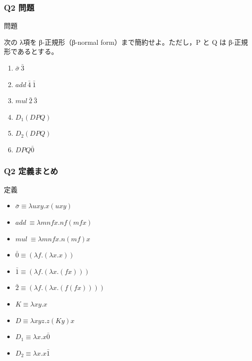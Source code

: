 \begin{frame}
\frametitle{Q2 問題}
\begin{alertblock}{問題}

    次の λ項を β-正規形（β-normal form）まで簡約せよ。ただし，P と Q は β-正規形であるとする。

    \begin{enumerate}[(1)]
        \item $\bar{\sigma}\ \bar{3}$
        \item $add\ \bar{4}\ \bar{1}$
        \item $mul\ \bar{2}\ \bar{3}$
        \item $D_1(DPQ)$
        \item $D_2(DPQ)$
        \item $DPQ\bar{0}$
    \end{enumerate}
\end{alertblock}
\end{frame}

\begin{frame}
\frametitle{Q2 定義まとめ}
\begin{alertblock}{定義}
    \begin{itemize}
    \item $\bar{\sigma} \equiv \lambda uxy.x(uxy)$
    \item $add\ \equiv \lambda mnfx.nf(mfx)$
    \item $mul\ \equiv \lambda mnfx.n(mf)x$
    \item $\bar{0} \equiv (\lambda f.(\lambda x.x))$
    \item $\bar{1} \equiv (\lambda f.(\lambda x.(fx)))$
    \item $\bar{2} \equiv (\lambda f.(\lambda x.(f(fx))))$
    \item $K \equiv \lambda xy.x$
    \item $D \equiv \lambda xyz.z(Ky)x$
    \item $D_1 \equiv \lambda x.x\bar{0}$
    \item $D_2 \equiv \lambda x.x\bar{1}$
    \end{itemize}
\end{alertblock}

\end{frame}

